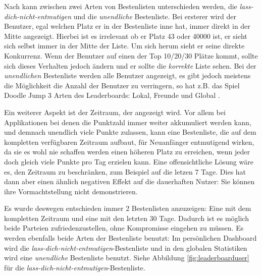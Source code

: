 \documentclass[12pt,twoside]{book}
\begin{document}
Nach \citep[pp. 50 - 51]{zichermann2011gamification} kann zwischen zwei Arten von Bestenlisten unterschieden werden, die \textit{lass-dich-nicht-entmutigen} und die \textit{unendliche} Bestenliste. Bei ersterer wird der Benutzer, egal welchen Platz er in der Bestenliste inne hat, immer direkt in der Mitte angezeigt. Hierbei ist es irrelevant ob er Platz 43 oder 40000 ist, er sieht sich selbst immer in der Mitte der Liste. Um sich herum sieht er seine direkte Konkurrenz. Wenn der Benutzer auf einen der Top 10/20/30 Plätze kommt, sollte sich dieses Verhalten jedoch ändern und er sollte die \textit{korrekte} Liste sehen.
Bei der \textit{unendlichen} Bestenliste werden alle Benutzer angezeigt, es gibt jedoch meistens die Möglichkeit die Anzahl der Benutzer zu verringern, so hat z.B. das Spiel Doodle Jump 3 Arten des Leaderboards: Lokal, Freunde und Global \citep[pp. 51]{zichermann2011gamification}.

Ein weiterer Aspekt ist der Zeitraum, der angezeigt wird. Vor allem bei Applikationen bei denen die Punktzahl immer weiter akkumuliert werden kann, und demnach unendlich viele Punkte zulassen, kann eine Bestenliste, die auf dem kompletten verfügbaren Zeitraum aufbaut, für Neuanfänger entmutigend wirken, da sie es wohl nie schaffen werden einen höheren Platz zu erreichen, wenn jeder doch gleich viele Punkte pro Tag erzielen kann.
Eine offensichtliche Lösung wäre es, den Zeitraum zu beschränken, zum Beispiel auf die letzen 7 Tage. Dies hat dann aber einen ähnlich negativen Effekt auf die dauerhaften Nutzer: Sie können ihre Vormachtstellung nicht demonstrieren.

Es wurde deswegen entschieden immer 2 Bestenlisten anzuzeigen: Eine mit dem kompletten Zeitraum und eine mit den letzten 30 Tage. Dadurch ist es möglich beide Parteien zufriedenzustellen, ohne Kompromisse eingehen zu müssen. Es werden ebenfalls beide Arten der Bestenliste benutzt: Im persönlichen Dashboard wird die \textit{lass-dich-nicht-entmutigen}-Bestenliste und in den globalen Statistiken wird eine \textit{unendliche} Bestenliste benutzt. Siehe Abbildung \ref{fig:leaderboarduser} für die \textit{lass-dich-nicht-entmutigen}-Bestenliste.
\end{document}

